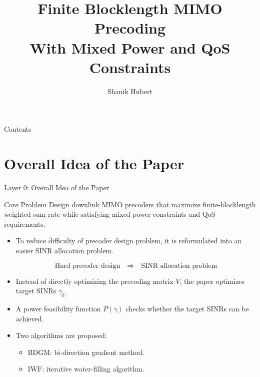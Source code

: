 \documentclass{beamer}
\title[Reference Presentation 2: Finite Blocklength MIMO Precoding]
{Finite Blocklength MIMO Precoding\\
With Mixed Power and QoS Constraints}
\author{Shanik Hubert}
\institute{
Paper Explanation Presentation\\[0.2cm]
\small Based on: Jingchen Wu et al., \textit{IEEE Communications Letters}, 2026
}
\date{}
\begin{document}
\begin{frame}{}
    \titlepage
\end{frame}

\begin{frame}{Contents}
  \tableofcontents
\end{frame}

\section{Overall Idea of the Paper}
\begin{frame}{Layer 0: Overall Idea of the Paper}
\small

\begin{block}{Core Problem}
Design downlink MIMO precoders that maximize finite-blocklength weighted sum rate while satisfying mixed power constraints and QoS requirements.
\end{block}

\begin{itemize}
    \item To reduce difficulty of precoder design problem, it is reformulated into an easier SINR allocation problem.\
    
    \[
        \text{Hard precoder design}
        \quad \Longrightarrow \quad
        \text{SINR allocation problem}
        \]
\end{itemize}
        
\begin{itemize}
    \item Instead of directly optimizing the precoding matrix \(V\), the paper optimizes target SINRs \(\gamma_k\).
    \item A power feasibility function \(P(\gamma)\) checks whether the target SINRs can be achieved.
    \item Two algorithms are proposed:
    \begin{itemize}
        \item BDGM: bi-direction gradient method.
        \item IWF: iterative water-filling algorithm.
    \end{itemize}
\end{itemize}

\end{frame}

\end{document}

